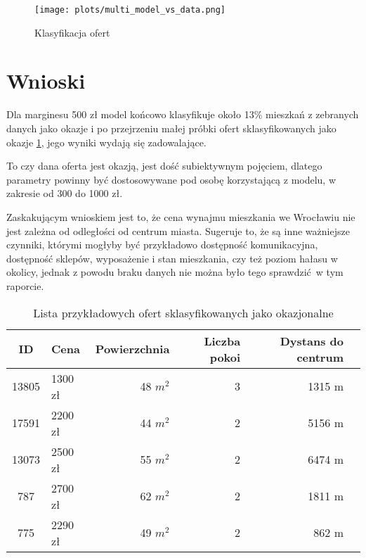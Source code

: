 \documentclass[12pt]{article}
\begin{document}
\begin{figure}[h!]
  \centering
  \texttt{[image: plots/multi\_model\_vs\_data.png]}
  \caption{Klasyfikacja ofert}
  \label{fig:classification}
\end{figure}

\pagebreak

\section{Wnioski}
Dla marginesu 500 zł model końcowo klasyfikuje około 13\% mieszkań z zebranych danych jako okazje i po przejrzeniu małej próbki ofert sklasyfikowanych jako okazje \ref{tab:best_offers}, jego wyniki wydają się zadowalające. 

To czy dana oferta jest okazją, jest dość subiektywnym pojęciem, dlatego parametry powinny być dostosowywane pod osobę korzystającą z modelu, w zakresie od 300 do 1000 zł.

Zaskakującym wnioskiem jest to, że cena wynajmu mieszkania we Wrocławiu nie jest zależna od odległości od centrum miasta. Sugeruje to, że są inne ważniejsze czynniki, którymi mogłyby być przykładowo dostępność komunikacyjna, dostępność sklepów, wyposażenie i stan mieszkania, czy też poziom hałasu w okolicy, jednak z powodu braku danych nie można było tego sprawdzić w tym raporcie.

\begin{table}[h]
  \centering
  \caption{Lista przykładowych ofert sklasyfikowanych jako okazjonalne}
  \label{tab:best_offers}
  \begin{tabular}{clrrrr}
      \toprule
      \textbf{ID} & \textbf{Cena} & \textbf{Powierzchnia} & \textbf{Liczba pokoi} & \textbf{Dystans do centrum} \\
      \midrule
      13805 & 1300 zł & 48 $m^2$ & 3 & 1315 m \\
      17591 & 2200 zł& 44 $m^2$ & 2 & 5156 m\\
      13073 &  2500 zł & 55 $m^2$ & 2 & 6474 m \\
      787   & 2700 zł & 62 $m^2$ & 2 & 1811 m \\
      775   & 2290 zł & 49 $m^2$ & 2 & 862 m \\
      \bottomrule
  \end{tabular}
\end{table}
\end{document}
